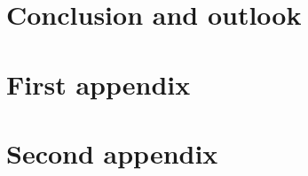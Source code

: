 \documentclass[a4paper, 11pt]{report}
\begin{document}
\chapter*{Conclusion and outlook}


\newpage                 %



\appendix


\chapter{First appendix}

\chapter{Second appendix}
\end{document}
